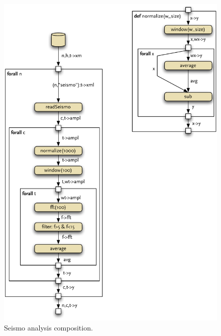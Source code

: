 \begin{figure}
  \centering
  \parbox{0.45\linewidth}{%
    \includegraphics[width=\linewidth]{figures/seismo_bus_composition}
    \caption{Seismo analysis composition.}%
    \label{fig:seismo_bus_composition}
  }%
  \qquad
  \begin{minipage}{0.45\linewidth}%

\end{minipage}
\end{figure}
